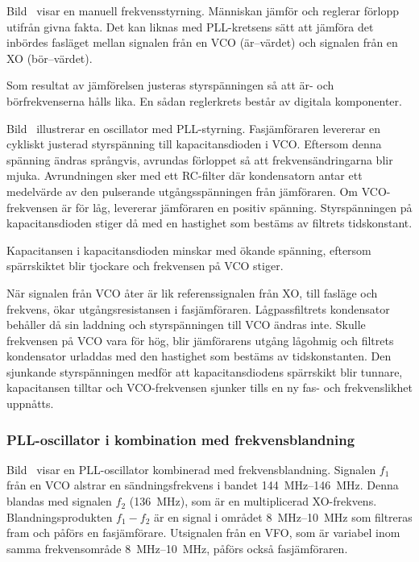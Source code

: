 Bild~ visar en manuell frekvensstyrning.
Människan jämför och reglerar förlopp utifrån givna fakta.
Det kan liknas med PLL-kretsens sätt att jämföra det inbördes fasläget mellan
signalen från en VCO (är--värdet) och signalen från en XO (bör--värdet).

Som resultat av jämförelsen justeras styrspänningen så att är- och
börfrekvenserna hålls lika.
En sådan reglerkrets består av digitala komponenter.


Bild~ illustrerar en oscillator med PLL-styr\-ning.
Fasjämföraren levererar en cykliskt justerad styrspänning till
kapacitansdioden i VCO.
Eftersom denna spänning ändras språngvis, avrundas förloppet så att
frekvensändringarna blir mjuka.
Avrundningen sker med ett RC-filter där kondensatorn antar ett medelvärde av
den pulserande utgångsspänningen från jämföraren.
Om VCO-frekvensen är för låg, levererar jämföraren en positiv spänning.
Styrspänningen på kapacitansdioden stiger då med en hastighet som bestäms av
filtrets tidskonstant.

Kapacitansen i kapacitansdioden minskar med ökande spänning, eftersom
spärrskiktet blir tjockare och frekvensen på VCO stiger.

När signalen från VCO åter är lik referenssignalen från XO, till
fasläge och frekvens, ökar utgångsresistansen i fasjämföraren.
Lågpassfiltrets kondensator behåller då sin laddning och styrspänningen till
VCO ändras inte.
Skulle frekvensen på VCO vara för hög, blir jämförarens utgång lågohmig och
filtrets kondensator urladdas med den hastighet som bestäms av tidskonstanten.
Den sjunkande styrspänningen medför att kapacitansdiodens spärrskikt blir
tunnare, kapacitansen tilltar och VCO-frekvensen sjunker tills en ny fas- och
frekvenslikhet uppnåtts.

\newpage
\subsubsection{PLL-oscillator i kombination med frekvensblandning}


Bild~ visar en PLL-oscillator kombinerad med
frekvensblandning.
Signalen \(f_1\) från en VCO alstrar en sändningsfrekvens i bandet
\SIrange{144}{146}{\mega\hertz}.
Denna blandas med signalen \(f_2\) (\qty{136}{\mega\hertz}), som är en
multiplicerad XO-frekvens.
Blandningsprodukten \(f_1 - f_2\) är en signal i området
\SIrange{8}{10}{\mega\hertz} som filtreras fram och påförs en fasjämförare.
Utsignalen från en VFO, som är variabel inom samma frekvensområde
\SIrange{8}{10}{\mega\hertz}, påförs också fasjämföraren.

